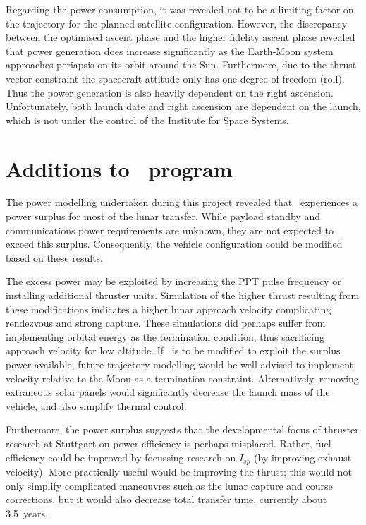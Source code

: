 Regarding the power consumption, it was revealed not to be a limiting factor on the trajectory for the planned satellite configuration. However, the discrepancy between the optimised ascent phase and the higher fidelity ascent phase revealed that power generation does increase significantly as the Earth-Moon system approaches periapsis on its orbit around the Sun. Furthermore, due to the thrust vector constraint the spacecraft attitude only has one degree of freedom (roll). Thus the power generation is also heavily dependent on the right ascension. Unfortunately, both launch date and right ascension are dependent on the launch, which is not under the control of the Institute for Space Systems.









\section{Additions to \BW\ program} \label{sec:BW1-additions}

The power modelling undertaken during this project revealed that \BW\ experiences a power surplus for most of the lunar transfer. While payload standby and communications power requirements are unknown, they are not expected to exceed this surplus. Consequently, the vehicle configuration could be modified based on these results.

The excess power may be exploited by increasing the PPT pulse frequency or installing additional thruster units. Simulation of the higher thrust resulting from these modifications indicates a higher lunar approach velocity complicating rendezvous and strong capture. These simulations did perhaps suffer from implementing orbital energy as the termination condition, thus sacrificing approach velocity for low altitude. If \BW\ is to be modified to exploit the surplus power available, future trajectory modelling would be well advised to implement velocity relative to the Moon as a termination constraint. Alternatively, removing extraneous solar panels would significantly decrease the launch mass of the vehicle, and also simplify thermal control. 

Furthermore, the power surplus suggests that the developmental focus of thruster research at Stuttgart on power efficiency is perhaps misplaced. Rather, fuel efficiency could be improved by focussing research on $I_{sp}$ (by improving exhaust velocity). More practically useful would be improving the thrust; this would not only simplify complicated maneouvres such as the lunar capture and course corrections, but it would also decrease total transfer time, currently about 3.5~years.

